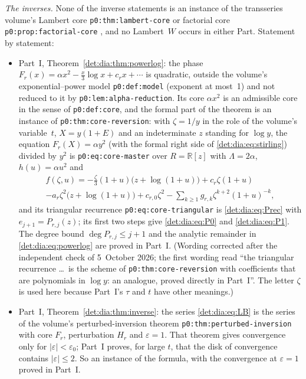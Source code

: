 \documentclass[11pt,letterpaper]{article}
\numberwithin{equation}{section}
\theoremstyle{definition}\newtheorem{definition}[theorem]{Definition}
\theoremstyle{remark}\newtheorem{remark}[theorem]{Remark}
\newcommand{\file}[1]{\nolinkurl{#1}}
\begin{document}
\emph{The inverses.} None of the inverse statements is an instance of the transseries volume's Lambert core \file{p0:thm:lambert-core} or factorial core \file{p0:prop:factorial-core} \cite{TSvol}, and no Lambert~$W$ occurs in either Part. Statement by statement:
\begin{itemize}
\item Part~I, Theorem~\ref{det:dia:thm:powerlog}: the phase $F_r(x)=\alpha x^2-\frac x3\log x+c_rx+\cdots$ is quadratic, outside the volume's exponential--power model \file{p0:def:model} (exponent at most~1) and not reduced to it by \file{p0:lem:alpha-reduction}. Its core $\alpha x^2$ is an admissible core in the sense of \file{p0:def:core}, and the formal part of the theorem is an instance of \file{p0:thm:core-reversion}: with $\zeta=1/y$ in the role of the volume's variable~$t$, $X=y(1+E)$ and an indeterminate $z$ standing for $\log y$, the equation $F_r(X)=\alpha y^2$ (with the formal right side of \eqref{det:dia:eq:stirling}) divided by $y^2$ is \file{p0:eq:core-master} over $R=\mathbb R[z]$ with $\Lambda=2\alpha$, $h(u)=\alpha u^2$ and
\begin{multline*}
 f(\zeta,u)=-\frac\zeta3(1+u)\bigl(z+\log(1+u)\bigr)+c_r\zeta(1+u)\\
 -a_r\zeta^2\bigl(z+\log(1+u)\bigr)+c_{r,0}\zeta^2-\sum_{k\ge1}g_{r,k}\zeta^{k+2}(1+u)^{-k},
\end{multline*}
and its triangular recurrence \file{p0:eq:core-triangular} is \eqref{det:dia:eq:Prec} with $e_{j+1}=P_{r,j}(z)$; its first two steps give \eqref{det:dia:eq:P0} and \eqref{det:dia:eq:P1}. The degree bound $\deg P_{r,j}\le j+1$ and the analytic remainder in \eqref{det:dia:eq:powerlog} are proved in Part~I. \textup{(Wording corrected after the independent check of 5~October 2026; the first wording read ``the triangular recurrence \dots\ is the scheme of \file{p0:thm:core-reversion} with coefficients that are polynomials in $\log y$: an analogue, proved directly in Part~I''. The letter $\zeta$ is used here because Part~I's $\tau$ and $t$ have other meanings.)}
\item Part~I, Theorem~\ref{det:dia:thm:inverse}: the series \eqref{det:dia:eq:LB} is the series of the volume's perturbed-inversion theorem \file{p0:thm:perturbed-inversion} with core $F_r$, perturbation $H_r$ and $\varepsilon=1$. That theorem gives convergence only for $|\varepsilon|<\varepsilon_0$; Part~I proves, for large $t$, that the disk of convergence contains $|\varepsilon|\le2$. So an instance of the formula, with the convergence at $\varepsilon=1$ proved in Part~I.

\end{itemize}
\end{document}

